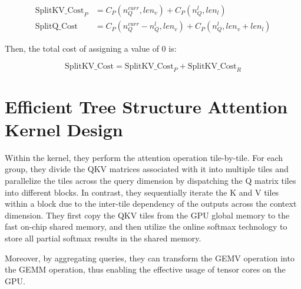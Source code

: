 \begin{align}
\text{SplitKV\_Cost}_P &= C_P(n_Q^{curr}, len_v)
+ C_P(n_Q^l, len_l) \\
\text{SplitQ\_Cost} &= C_P(n_Q^{curr} - n_Q^l, len_v)
+ C_P(n_Q^l, len_v + len_l)
\end{align}

Then, the total cost of assigning a value of $0$ is:

\begin{equation}
\text{SplitKV\_Cost} = \text{SplitKV\_Cost}_P + \text{SplitKV\_Cost}_R
\end{equation}

\section{Efficient Tree Structure Attention Kernel Design}
Within the kernel, they perform the attention operation tile-by-tile. For each group, they divide the QKV matrices associated with it into multiple tiles and parallelize the tiles across the query dimension by dispatching the Q matrix
tiles into different blocks. In contrast, they sequentially iterate the K and V tiles within a block due to the inter-tile dependency of the outputs across the context dimension. They first copy the QKV tiles from the GPU global memory to the fast on-chip shared memory, and then utilize the online softmax technology to store all partial softmax results in the shared memory.

Moreover, by aggregating queries, they can transform the GEMV operation into the GEMM operation, thus enabling the effective usage of tensor cores on the GPU.